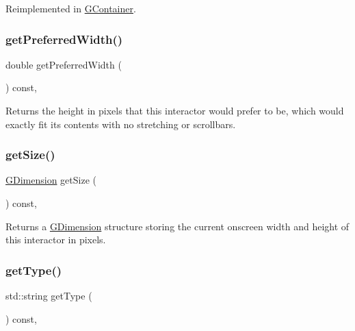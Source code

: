 Reimplemented in \mbox{\hyperlink{classGContainer_ac0fd6fc35681f935c67ad68078b354b8}{G\+Container}}.

\mbox{\label{classGInteractor_a82bca31d37700fb0e35d2743352efd5e}} 
\subsubsection{\texorpdfstring{get\+Preferred\+Width()}{getPreferredWidth()}}
{\footnotesize\ttfamily double get\+Preferred\+Width (\begin{DoxyParamCaption}{ }\end{DoxyParamCaption}) const\hspace{0.3cm}{\ttfamily [virtual]}, {\ttfamily [inherited]}}



Returns the height in pixels that this interactor would prefer to be, which would exactly fit its contents with no stretching or scrollbars. 

\mbox{\label{classGInteractor_a7b4eec96a2bdc6420695d5796a78eea9}} 
\subsubsection{\texorpdfstring{get\+Size()}{getSize()}}
{\footnotesize\ttfamily \mbox{\hyperlink{structGDimension}{G\+Dimension}} get\+Size (\begin{DoxyParamCaption}{ }\end{DoxyParamCaption}) const\hspace{0.3cm}{\ttfamily [virtual]}, {\ttfamily [inherited]}}



Returns a \mbox{\hyperlink{structGDimension}{G\+Dimension}} structure storing the current onscreen width and height of this interactor in pixels. 

\mbox{\label{classGSpacer_a9b72ede4ee8520f987a0c01e30654814}} 
\subsubsection{\texorpdfstring{get\+Type()}{getType()}}
{\footnotesize\ttfamily std\+::string get\+Type (\begin{DoxyParamCaption}{ }\end{DoxyParamCaption}) const\hspace{0.3cm}{\ttfamily [override]}, {\ttfamily [virtual]}}



